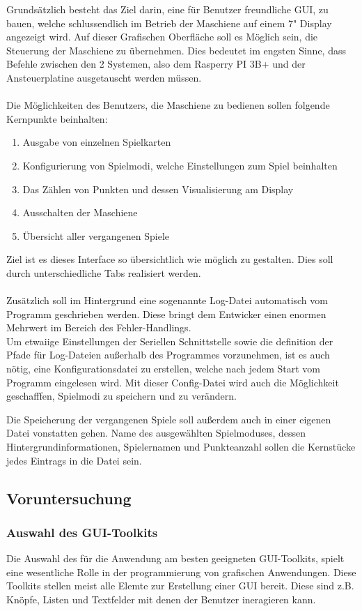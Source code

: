 Grundsätzlich besteht das Ziel darin, eine für Benutzer freundliche GUI, zu bauen, welche schlussendlich im Betrieb der Maschiene auf einem 7" Display angezeigt wird. Auf dieser Grafischen Oberfläche soll es Möglich sein, die Steuerung der Maschiene zu übernehmen.
Dies bedeutet im engsten Sinne, dass Befehle zwischen den 2 Systemen, also dem Rasperry PI 3B+ und der Ansteuerplatine ausgetauscht werden müssen.\\\\
Die Möglichkeiten des Benutzers, die Maschiene zu bedienen sollen folgende Kernpunkte beinhalten:
\begin{enumerate}
    \item Ausgabe von einzelnen Spielkarten
    \item Konfigurierung von Spielmodi, welche Einstellungen zum Spiel beinhalten
    \item Das Zählen von Punkten und dessen Visualisierung am Display
    \item Ausschalten der Maschiene
    \item Übersicht aller vergangenen Spiele
\end{enumerate}
Ziel ist es dieses Interface so übersichtlich wie möglich zu gestalten. Dies soll durch unterschiedliche Tabs realisiert werden.\\\\
Zusätzlich soll im Hintergrund eine sogenannte Log-Datei automatisch vom Programm geschrieben werden. Diese bringt dem Entwicker einen enormen Mehrwert im Bereich des Fehler-Handlings. \\
Um etwaiige Einstellungen der Seriellen Schnittstelle sowie die definition der Pfade für Log-Dateien außerhalb des Programmes vorzunehmen, ist es auch nötig, eine Konfigurationsdatei zu erstellen, welche nach jedem Start vom Programm eingelesen wird. Mit dieser Config-Datei wird auch die Möglichkeit geschafffen,
Spielmodi zu speichern und zu verändern.

Die Speicherung der vergangenen Spiele soll außerdem auch in einer eigenen Datei vonstatten gehen. Name des ausgewählten Spielmoduses, dessen Hintergrundinformationen, Spielernamen und Punkteanzahl sollen die Kernstücke jedes Eintrags in die Datei sein.\newpage

\subsection{Voruntersuchung}\label{subsec:voruntersuchung}

\subsubsection{Auswahl des GUI-Toolkits}
Die Auswahl des für die Anwendung am besten geeigneten GUI-Toolkits, spielt eine wesentliche Rolle in der programmierung von grafischen Anwendungen. Diese Toolkits stellen meist alle Elemte zur Erstellung einer GUI bereit. Diese sind z.B. Knöpfe, Listen und Textfelder mit denen der Benutzer ineragieren kann.

